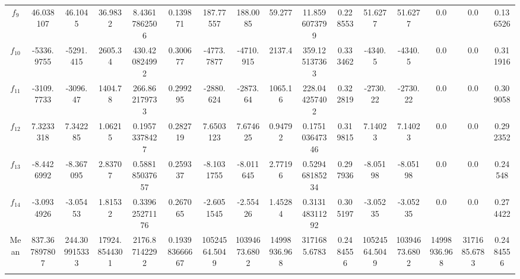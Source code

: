 \documentclass[paper=a4, fontsize=11pt]{scrartcl} %
\numberwithin{equation}{section} %
\numberwithin{figure}{section} %
\numberwithin{table}{section} %
\begin{document}
\begin{landscape}
\begin{table}
\begin{tabular}{c|ccccc|ccccc|ccccc}
			$f_{9}$ & 46.038107 & 46.1045 & 36.9832 & 8.43617862506 & 0.139871 & 187.77557 & 188.0085 & 59.277 & 11.8596073799 & 0.228553 & 51.6277 & 51.6277 & 0.0 & 0.0 & 0.136526\\
			$f_{10}$ & -5336.9755 & -5291.415 & 2605.34 & 430.420824992 & 0.300677 & -4773.7877 & -4710.915 & 2137.4 & 359.125137363 & 0.333462 & -4340.5 & -4340.5 & 0.0 & 0.0 & 0.311916\\
			$f_{11}$ & -3109.7733 & -3096.47 & 1404.78 & 266.862179733 & 0.299295 & -2880.624 & -2873.64 & 1065.16 & 228.044257402 & 0.322819 & -2730.22 & -2730.22 & 0.0 & 0.0 & 0.309058\\
			$f_{12}$ & 7.3233318 & 7.342285 & 1.06215 & 0.19573378427 & 0.282719 & 7.6503123 & 7.674625 & 0.94792 & 0.175103647346 & 0.319815 & 7.14023 & 7.14023 & 0.0 & 0.0 & 0.292352\\
			$f_{13}$ & -8.4426992 & -8.367095 & 2.83707 & 0.588185037657 & 0.259337 & -8.1031755 & -8.011645 & 2.77196 & 0.529468185234 & 0.297936 & -8.05198 & -8.05198 & 0.0 & 0.0 & 0.24548\\
			$f_{14}$ & -3.0934926 & -3.05453 & 1.81532 & 0.339625271176 & 0.267065 & -2.6051545 & -2.55426 & 1.45284 & 0.313148311292 & 0.305197 & -3.05235 & -3.05235 & 0.0 & 0.0 & 0.274422\\
			
			\noalign{\smallskip}\hline\noalign{\smallskip}
			Mean & 837.367897807 & 244.309915333 & 17924.8544301 & 2176.87142292 & 0.193983666667 & 10524564.5049 & 10394673.6802 & 14998936.968 & 3171685.6783 & 0.2484556 & 10524564.5049 & 10394673.6802 & 14998936.968 & 3171685.6783 & 0.2484556\\
			\noalign{\smallskip}\hline\noalign{\smallskip}
			\multicolumn{16}{l}{\tiny $^1$ 3.2GHz AMD Ryzen 7 1700X, 16 GB RAM}
		\end{tabular}\label{DE_20}
	\end{table}
\end{landscape}

\pagebreak
\end{document}
